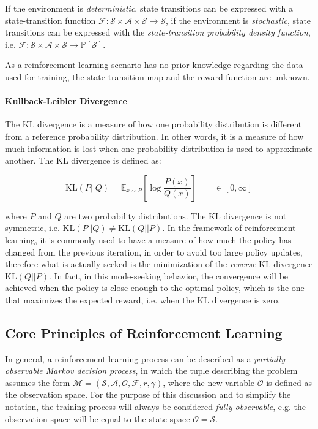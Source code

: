 If the environment is \textit{deterministic}, state transitions can be expressed with a state-transition function $\mathcal{F}: \mathcal{S} \times \mathcal{A} \times \mathcal{S} \rightarrow \mathcal{S}$, if the environment is \textit{stochastic}, state transitions can be expressed with the \textit{state-transition probability density function}, i.e. $\mathcal{F}: \mathcal{S} \times \mathcal{A} \times \mathcal{S} \rightarrow \mathbb{P}[\mathcal{S}]$.

As a reinforcement learning scenario has no prior knowledge regarding the data used for training, the state-transition map and the reward function are unknown.


\paragraph{Kullback-Leibler Divergence} The \ac{KL} divergence is a measure of how one probability distribution is different from a reference probability distribution. In other words, it is a measure of how much information is lost when one probability distribution is used to approximate another. The \ac{KL} divergence is defined as:

\begin{equation}
    \mathrm{KL}(P||Q) = \mathbb{E} _{x \sim P} \left[ \log \frac{P(x)}{Q(x)} \right] \qquad \in \left[0, \infty \right]
\end{equation}

where $P$ and $Q$ are two probability distributions. The \ac{KL} divergence is not symmetric, i.e. $\mathrm{KL}(P||Q) \neq \mathrm{KL}(Q||P)$. In the framework of reinforcement learning, it is commonly used to have a measure of how much the policy has changed from the previous iteration, in order to avoid too large policy updates, therefore what is actually seeked is the minimization of the \textit{reverse} \ac{KL} divergence $\mathrm{KL}(Q||P)$. In fact, in this mode-seeking behavior, the convergence will be achieved when the policy is close enough to the optimal policy, which is the one that maximizes the expected reward, i.e. when the \ac{KL} divergence is zero.

\subsection{Core Principles of Reinforcement Learning}

In general, a reinforcement learning process can be described as a \textit{partially observable Markov decision process}, in which the tuple describing the problem assumes the form $\mathcal{M} =  (\mathcal{S}, \mathcal{A}, \mathcal{O}, \mathcal{F}, r, \gamma)$, where the new variable $\mathcal{O}$ is defined as the observation space. For the purpose of this discussion and to simplify the notation, the training process will always be considered \textit{fully observable}, e.g. the observation space will be equal to the state space $\mathcal{O} = \mathcal{S}$.

